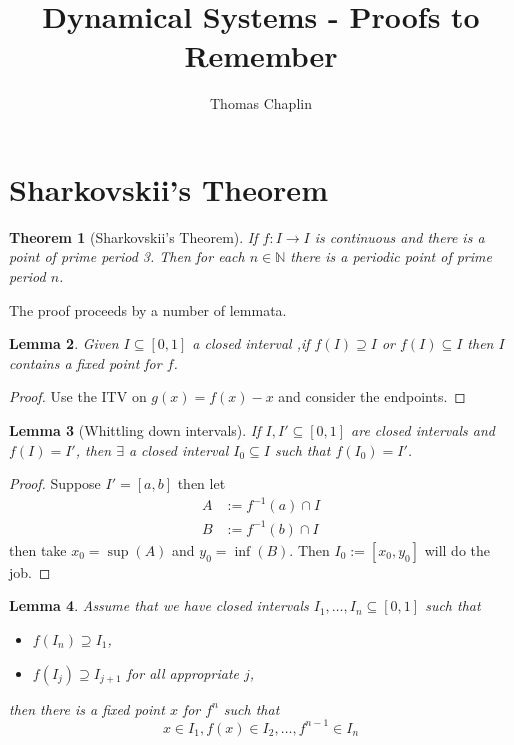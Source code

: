 \documentclass[11pt]{article}
\title{Dynamical Systems - Proofs to Remember}
\author{Thomas Chaplin}
\date{}
\newcommand{\defeq}{:=}
\newcommand{\N}{\mathbb{N}}
\newtheorem{theorem}{Theorem}[section]
\newtheorem{lemma}[theorem]{Lemma}
\begin{document}
\maketitle

\section{Sharkovskii's Theorem}
\begin{theorem}[Sharkovskii's Theorem]
\label{thrm:shark}
If $f:I \to I $ is continuous and there is a point of prime period 3.
Then for each $n\in \N$ there is a periodic point of prime period $n$.
\end{theorem}

The proof proceeds by a number of lemmata.

\begin{lemma}
Given $I\subseteq[0 ,1 ]$ a closed interval ,if $f(I) \supseteq I$ or $f(I) \subseteq I$ then $I$ contains a fixed point for $f$.
\end{lemma}

\begin{proof}
Use the ITV on $g(x)=f(x)-x$ and consider the endpoints.
\end{proof}

\begin{lemma}[Whittling down intervals]
If $I, I' \subseteq [0,1]$ are closed intervals and $f(I)=I'$, then $\exists$ a closed interval $I_0\subseteq I$ such that $f(I_0)=I'$.
\end{lemma}
\begin{proof}
Suppose $I'=[a, b]$ then let
\begin{align*}
	A & \defeq f^{-1}(a)\cap I \\
	B & \defeq f^{-1}(b)\cap I
\end{align*}
then take $x_0=\sup(A)$ and $y_0=\inf(B)$.
Then $I_0\defeq [x_0, y_0]$ will do the job.
\end{proof}

\begin{lemma}
Assume that we have closed intervals $I_1, \dots, I_n \subseteq [0, 1]$ such that
\begin{itemize}
	\item $f(I_n)\supseteq I_1$,
	\item $f(I_j)\supseteq I_{j+1}$ for all appropriate $j$,
\end{itemize}
then there is a fixed point $x$ for $f^n$ such that
\[
	x\in I_1, f(x) \in I_2, \dots , f^{n-1}\in I_n
\]
\end{lemma}
\end{document}
